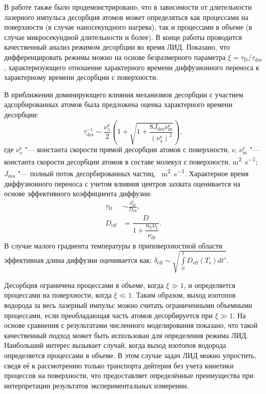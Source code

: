 В работе также было продемонстрировано, что в зависимости от длительности лазерного импульса десорбция атомов может определяться как процессами на поверхности (в случае наносекундного нагрева), так и процессами в объеме (в случае микросекундной длительности и более). В конце работы проводится качественный анализ режимом десорбции во время ЛИД. Показано, что дифференцировать режимы можно на основе безразмерного параметра \( \xi=\tau_\mathrm{D}/\tau_\mathrm{des} \), характеризующего отношение характерного времени диффузионного переноса к характерному времени десорбции с поверхности. 

В приближении доминирующего влияния механизмов десорбции с участием адсорбированных атомов была предложена оценка характерного времени десорбции:
\begin{equation}
    \tau_\mathrm{des}^{-1} \sim \dfrac{\nu_\mathrm{a}^\mathrm{s}}{2} \left( 1 + \sqrt{1+\dfrac{8J_\mathrm{des}\nu_\mathrm{m}^\mathrm{s}}{(\nu_\mathrm{a}^\mathrm{s})^2}} \right),
\end{equation}
где \( \nu_\mathrm{a}^\mathrm{s} \) "--- константа скорости прямой десорбции атомов с поверхности, \si{\second}; \( \nu_\mathrm{m}^\mathrm{s} \) "--- константа скорости десорбции атомов в составе молекул с поверхности, \si{\meter\squared\per\second}; \( J_\mathrm{des} \) "--- полный поток десорбированных частиц, \si{\per\meter\squared\per\second}. Характерное время диффузионного переноса с учетом влияния центров захвата оценивается на основе эффективного коэффициента диффузии:
\begin{subequations}
    \begin{align}
        \tau_\mathrm{D}         & \sim \frac{\delta_\mathrm{eff}^2}{D_\mathrm{eff}}, \\
        D_\mathrm{eff} & = \dfrac{D}{1+\dfrac{n_\mathrm{t}\nu_\mathrm{t}}{\nu_\mathrm{dt}}}. 
    \end{align}
\end{subequations}
В случае малого градиента температуры в приповерхностной области эффективная длина диффузии оценивается как: \( \delta_\mathrm{eff} \sim \sqrt{\int\limits_0^t D_\mathrm{eff}(T_\mathrm{s})dt'}\). 

Десорбция ограничена процессами в объеме, когда \( \xi \gg 1 \), и определяется процессами на поверхности, когда \( \xi \ll 1 \). Таким образом, выход изотопов водорода за весь лазерный импульс можно считать ограниченными объемными процессами, если преобладающая часть атомов десорбируется при \( \xi \gg 1 \). На основе сравнения с результатами численного моделирования показано, что такой качественный подход может быть использован для определения режима ЛИД. Наибольший интерес вызывает случай, когда выход изотопов водорода определяется процессами в объеме. В этом случае задач ЛИД можно упростить, сведя её к рассмотрению только транспорта дейтерия без учета кинетики процессов на поверхности, что предоставляет определённые преимущества при интерпретации результатов экспериментальных измерении.

